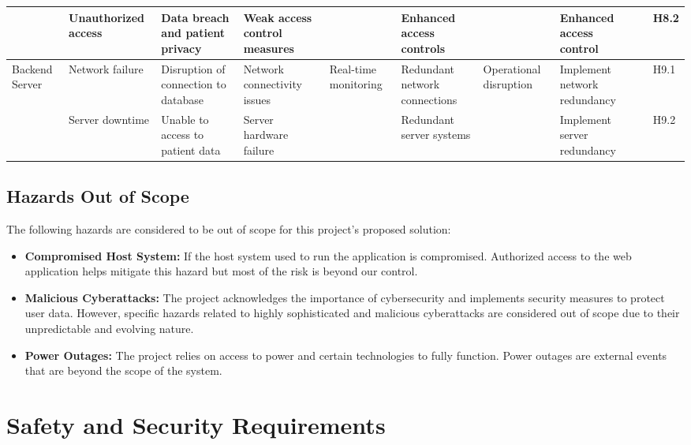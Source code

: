 \documentclass{article}
\begin{document}
\begin{landscape}
\begin{table}[hp]
\begin{footnotesize}
\begin{tabular}{|p{1in}|p{1in}|p{1in}|p{1.5in}|p{0.6in}|p{0.5in}|p{0.3in}|p{2.5in}|p{0.2in}|p{0.2in}|}
        \cline{2-4}\cline{6-6}\cline{8-8}\cline{10-10}
        & Unauthorized access & Data breach and patient privacy & Weak access control measures & & Enhanced access controls & & Enhanced access control & & H8.2 \\
        \hline
        \multirow{2}{1in}{Backend Server} & Network failure & Disruption of connection to database & Network connectivity issues & \multirow{2}{0.6in}{Real-time monitoring} & Redundant network connections & \multirow{2}{0.2in}{Operational disruption} & Implement network redundancy & & H9.1 \\
        \cline{2-4}\cline{6-6}\cline{8-8}\cline{10-10}
        & Server downtime & Unable to access to patient data & Server hardware failure & & Redundant server systems & & Implement server redundancy & & H9.2 \\
        \bottomrule
    \end{tabular}
    \end{footnotesize}
\end{table}
\end{landscape}
\restoregeometry

\subsection{Hazards Out of Scope}
The following hazards are considered to be out of scope for this project's proposed solution:
\begin{itemize}
    \item \textbf{Compromised Host System:} If the host system used to run the application is compromised. Authorized access to the web application helps mitigate this hazard but most of the risk is beyond our control.
    \item \textbf{Malicious Cyberattacks:} The project acknowledges the importance of cybersecurity and implements security measures to protect user data. However, specific hazards related to highly sophisticated and malicious cyberattacks are considered out of scope due to their unpredictable and evolving nature.
    \item \textbf{Power Outages:} The project relies on access to power and certain technologies to fully function. Power outages are external events that are beyond the scope of the system.
\end{itemize} 


\section{Safety and Security Requirements}
\end{document}
